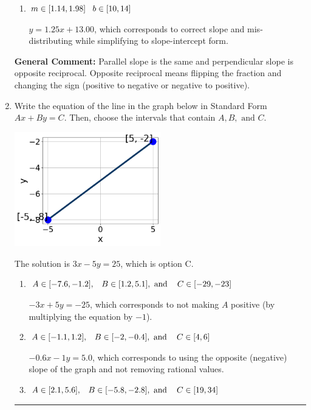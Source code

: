 \documentclass{extbook}[14pt]
\newcommand{\litem}[1]{\item #1

\rule{\textwidth}{0.4pt}}
\begin{document}
\begin{enumerate}
{\begin{enumerate}[label=\Alph*.]
 $y = 0.80x + 15.00$, which corresponds to using the reciprocal slope $(1/m)$.
\item \( m \in [1.14, 1.98] \hspace*{3mm} b \in [10, 14] \)

 $y = 1.25x + 13.00$, which corresponds to correct slope and mis-distributing while simplifying to slope-intercept form.
\end{enumerate}

\textbf{General Comment:} Parallel slope is the same and perpendicular slope is opposite reciprocal. Opposite reciprocal means flipping the fraction and changing the sign (positive to negative or negative to positive).
}
\litem{
Write the equation of the line in the graph below in Standard Form $Ax+By=C$. Then, choose the intervals that contain $A, B, \text{ and } C$.

\begin{center}
    \includegraphics[width=0.5\textwidth]{../Figures/linearGraphToStandardC.png}
\end{center}


The solution is \( 3x - 5y = 25 \), which is option C.\begin{enumerate}[label=\Alph*.]
\item \( A \in [-7.6, -1.2], \hspace{3mm} B \in [1.2, 5.1], \text{ and } \hspace{3mm} C \in [-29, -23] \)

 $-3x + 5y = -25$, which corresponds to not making $A$ positive (by multiplying the equation by $-1$).
\item \( A \in [-1.1, 1.2], \hspace{3mm} B \in [-2, -0.4], \text{ and } \hspace{3mm} C \in [4, 6] \)

 $-0.6x - 1y = 5.0$, which corresponds to using the opposite (negative) slope of the graph and not removing rational values.
\item \( A \in [2.1, 5.6], \hspace{3mm} B \in [-5.8, -2.8], \text{ and } \hspace{3mm} C \in [19, 34] \)


\end{enumerate}}
\end{enumerate}
\end{document}
